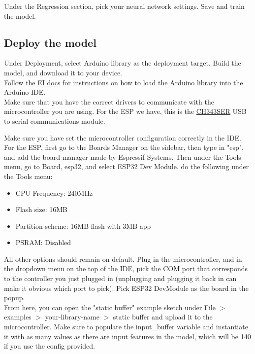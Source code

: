 \documentclass{article}
\begin{document}
Under the Regression section, pick your neural network settings. Save and train the model.\\

\subsection{Deploy the model}

Under Deployment, select Arduino library as the deployment target. Build the model, and download it to your device.\\

Follow the \href{https://docs.edgeimpulse.com/hardware/deployments/run-arduino-2-0}{EI docs} for instructions on how to load the Arduino library into the Arduino IDE. \\

Make sure that you have the correct drivers to communicate with the microcontroller you are using. For the ESP we have, this is the \href{https://www.wch-ic.com/downloads/CH343SER_EXE.html}{CH343SER} USB to serial communications module.

Make sure you have set the microcontroller configuration correctly in the IDE. For the ESP, first go to the Boards Manager on the sidebar, then type in "esp", and add the board manager made by Espressif Systems. Then under the Tools menu, go to Board, esp32, and select ESP32 Dev Module. do the following under the Tools menu:

\begin{itemize}
    \item CPU Frequency: 240MHz
    \item Flash size: 16MB
    \item Partition scheme: 16MB flash with 3MB app
    \item PSRAM: Disabled
\end{itemize}

All other options should remain on default. Plug in the microcontroller, and in the dropdown menu on the top of the IDE, pick the COM port that corresponds to the controller you just plugged in (unplugging and plugging it back in can make it obvious which port to pick). Pick ESP32 DevModule as the board in the popup.\\

From here, you can open the "static buffer" example sketch under File $>$ examples $>$ your-library-name $>$ static buffer and upload it to the microcontroller. Make sure to populate the input\_buffer variable and instantiate it with as many values as there are input features in the model, which will be 140 if you use the config provided.
\end{document}
